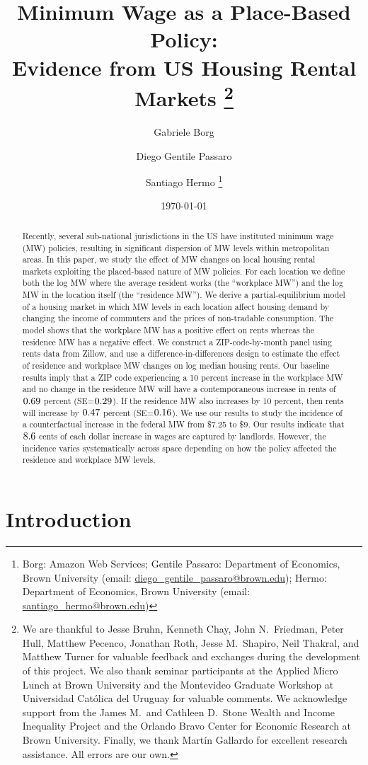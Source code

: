 \documentclass{article}
\title{ Minimum Wage as a Place-Based Policy: \\
        Evidence from US Housing Rental Markets%
        \thanks{We are thankful to Jesse Bruhn, Kenneth Chay, John N.\ Friedman, 
        Peter Hull, Matthew Pecenco, Jonathan Roth, Jesse M.\ Shapiro, 
        Neil Thakral, and Matthew Turner
        for valuable feedback and exchanges during the development of 
        this project.
        We also thank seminar participants at the Applied Micro Lunch at Brown
        University and the Montevideo Graduate Workshop at Universidad Católica 
        del Uruguay for valuable comments.
        We acknowledge support from 
        the James M.\ and Cathleen D.\ Stone 
        Wealth and Income Inequality Project and 
        the Orlando Bravo Center for Economic Research at Brown University.
        Finally, we thank Martín Gallardo for excellent research assistance.
        All errors are our own.}}
\author{Gabriele Borg \and Diego Gentile Passaro \and Santiago Hermo 
        \footnote{Borg: Amazon Web Services;
        Gentile Passaro: Department of Economics, Brown University 
        (email: \url{diego_gentile_passaro@brown.edu}); 
        Hermo: Department of Economics, Brown University 
        (email: \url{santiago_hermo@brown.edu})}}
\date{\today}
\begin{document}
\maketitle

\begin{abstract}
    \noindent
    Recently, several sub-national jurisdictions in the US have instituted 
    minimum wage (MW) policies, resulting in significant dispersion of MW levels 
    within metropolitan areas.
    In this paper, we study the effect of MW changes on local housing rental 
    markets exploiting the placed-based nature of MW policies.
    For each location we define both
    the log MW where the average resident works (the ``workplace MW'')
    and the log MW in the location itself (the ``residence MW'').
    We derive a partial-equilibrium model of a housing market
    in which MW levels in each location affect housing demand by 
    changing the income of commuters and the prices of non-tradable consumption. 
    The model shows that the workplace MW has a positive effect on rents 
    whereas the residence MW has a negative effect.
    We construct a ZIP-code-by-month panel using rents data from Zillow, and
    use a difference-in-differences design to estimate the effect of 
    residence and workplace MW changes on log median housing rents.
    Our baseline results imply that a ZIP code experiencing a 
    10 percent increase in the workplace MW and 
    no change in the residence MW will have a contemporaneous increase in rents 
    of $\textnormal{0.69}$ percent (SE=$\textnormal{0.29}$).
    If the residence MW also increases by 10 percent, then 
    rents will increase by $\textnormal{0.47}$ percent (SE=$\textnormal{0.16}$).
    We use our results to study the incidence of a counterfactual increase in 
    the federal MW from \$7.25 to \$9.
    Our results indicate that $\textnormal{8.6}$ cents of each dollar
    increase in wages are captured by landlords.
    However, the incidence varies systematically across space depending on how
    the policy affected the residence and workplace MW levels.
\end{abstract}

\vspace{5mm}


\clearpage

\section{Introduction}\label{sec:intro}
    
\end{document}
